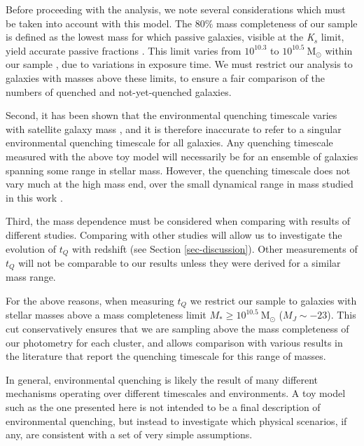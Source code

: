 Before proceeding with the analysis, we note several considerations which must be taken into account with this model.
The $80\%$ mass completeness of our sample is defined as the lowest mass for which passive galaxies, visible at the \textit{K$_s$} limit, yield accurate passive fractions \citep{van-der-Burg:2013zn}.
This limit varies from $10^{10.3}$ to $10^{10.5}\ \mathrm{M}_\odot$ within our sample \citep{van-der-Burg:2013zn,Nantais:2017aa}, due to variations in exposure time.
We must restrict our analysis to galaxies with masses above these limits, to ensure a fair comparison of the numbers of quenched and not-yet-quenched galaxies.

Second, it has been shown that the environmental quenching timescale varies with satellite galaxy mass \citep{De-Lucia:2012aa,Wetzel:2013aa,Wheeler:2014aa,Fillingham:2015aa}, and it is therefore inaccurate to refer to a singular environmental quenching timescale for all galaxies.
Any quenching timescale measured with the above toy model will necessarily be for an ensemble of galaxies spanning some range in stellar mass.
However, the quenching timescale does not vary much at the high mass end, over the small dynamical range in mass studied in this work \citep[e.g. see Fig. 8 of ][Figure 5]{Fillingham:2015aa,Wetzel:2013aa}.

Third, the mass dependence must be considered when comparing with results of different studies.
Comparing with other studies will allow us to investigate the evolution of $t_Q$ with redshift (see Section \ref{sec-discussion}).
Other measurements of $t_Q$ will not be comparable to our results unless they were derived for a similar mass range.

For the above reasons, when measuring $t_Q$ we restrict our sample to galaxies with stellar masses above a mass completeness limit $M_* \ge 10^{10.5}~ \mathrm{M}_\odot$ ($M_J\sim-23$).
This cut conservatively ensures that we are sampling above the mass completeness of our photometry for each cluster, and allows comparison with various results in the literature that report the quenching timescale for this range of masses.

In general, environmental quenching is likely the result of many different mechanisms operating over different timescales and environments.
A toy model such as the one presented here is not intended to be a final description of environmental quenching, but instead to investigate which physical scenarios, if any, are consistent with a set of very simple assumptions.

